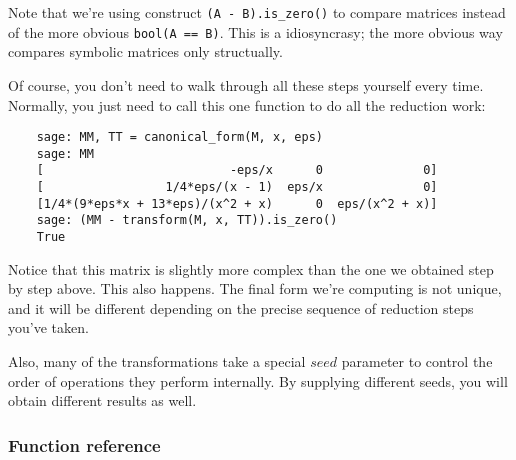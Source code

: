 \documentclass[12pt,a4paper]{article}
\begin{document}
Note that we're using construct \texttt{(A - B).is\_zero()} to compare matrices instead of the more obvious \texttt{bool(A == B)}.
This is a \sage idiosyncrasy; the more obvious way compares symbolic matrices only structually.

Of course, you don't need to walk through all these steps yourself every time.
Normally, you just need to call this one function to do all the reduction work:

\begin{verbatim}
    sage: MM, TT = canonical_form(M, x, eps)
    sage: MM
    [                          -eps/x      0              0]
    [                 1/4*eps/(x - 1)  eps/x              0]
    [1/4*(9*eps*x + 13*eps)/(x^2 + x)      0  eps/(x^2 + x)]
    sage: (MM - transform(M, x, TT)).is_zero()
    True
\end{verbatim}

Notice that this matrix is slightly more complex than the one we obtained step by step above.
This also happens.
The final form we're computing is not unique, and it will be different depending on the precise sequence of reduction steps you've taken.

Also, many of the transformations take a special $seed$ parameter to control the order of operations they perform internally.
By supplying different seeds, you will obtain different results as well.

\subsubsection{Function reference}
\end{document}
